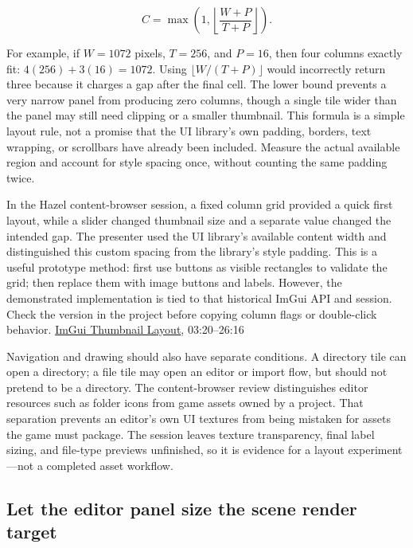 \[
C = \max\left(1,\left\lfloor\frac{W+P}{T+P}\right\rfloor\right).
\]

For example, if \(W=1072\) pixels, \(T=256\), and \(P=16\), then four columns exactly fit: \(4(256)+3(16)=1072\). Using \(\lfloor W/(T+P)\rfloor\) would incorrectly return three because it charges a gap after the final cell. The lower bound prevents a very narrow panel from producing zero columns, though a single tile wider than the panel may still need clipping or a smaller thumbnail. This formula is a simple layout rule, not a promise that the UI library's own padding, borders, text wrapping, or scrollbars have already been included. Measure the actual available region and account for style spacing once, without counting the same padding twice.

In the Hazel content-browser session, a fixed column grid provided a quick first layout, while a slider changed thumbnail size and a separate value changed the intended gap. The presenter used the UI library's available content width and distinguished this custom spacing from the library's style padding. This is a useful prototype method: first use buttons as visible rectangles to validate the grid; then replace them with image buttons and labels. However, the demonstrated implementation is tied to that historical ImGui API and session. Check the version in the project before copying column flags or double-click behavior. \href{https://www.youtube.com/watch?v=uQljBVVb-lU}{ImGui Thumbnail Layout}, 03:20--26:16

Navigation and drawing should also have separate conditions. A directory tile can open a directory; a file tile may open an editor or import flow, but should not pretend to be a directory. The content-browser review distinguishes editor resources such as folder icons from game assets owned by a project. That separation prevents an editor's own UI textures from being mistaken for assets the game must package. The session leaves texture transparency, final label sizing, and file-type previews unfinished, so it is evidence for a layout experiment---not a completed asset workflow.

\subsection{Let the editor panel size the scene render target}\label{06-engine-ii-ch032-let-the-editor-panel-size-the-scene-render-target}

\hypertarget{06-engine-ii-ch032-let-the-editor-panel-size-the-scene-render-target}{}

